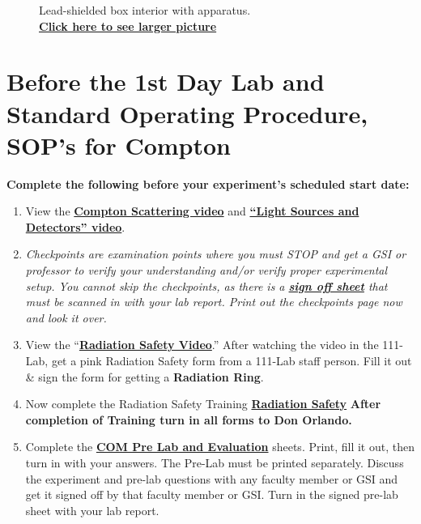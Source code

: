 \documentclass{../lab}
\begin{document}
\begin{figure}[!h]
\begin{minipage}{.49\linewidth}
    \caption{Lead-shielded box interior with apparatus. \\ \href{http://experimentationlab.berkeley.edu/sites/default/files/images/COM_Inside_3525-Lg.JPG}{\textbf{Click here to see larger picture}}}
\end{minipage} 
\end{figure}

\section{Before the 1st Day Lab and Standard Operating Procedure, SOP's for Compton}
\label{sec:BeforeTheLab}

\textbf{Complete the following before your experiment's scheduled start date:}

\begin{enumerate}
    \item View the \href{http://youtu.be/PVgqyf3kNRs}{\textbf{Compton Scattering video}} and \href{http://youtu.be/lQKLakISoBA}{\textbf{``Light Sources and Detectors'' video}}.

    \item \emph{Checkpoints are examination points where you must STOP and get a GSI or professor to verify your understanding and/or verify proper experimental setup. You cannot skip the checkpoints, as there is a \href{http://experimentationlab.berkeley.edu/node/132}{\textbf{sign off sheet}} that must be scanned in with your lab report. Print out the checkpoints page now and look it over.}

    \item View the     ``\href{http://youtu.be/KHxtzF5pZZM}{\textbf{Radiation Safety Video}}.'' After watching the video in the 111-Lab, get a pink Radiation Safety form from a 111-Lab staff person. Fill it out \& sign the form for getting a \textbf{Radiation Ring}.

    \item Now complete the Radiation Safety Training \href{http://experimentationlab.berkeley.edu/RadiationSafety}{\textbf{Radiation Safety}} \textbf{After completion of Training turn in all forms to Don Orlando.}

    \item Complete the \href{http://experimentationlab.berkeley.edu/COMPreLab}{\textbf{COM Pre Lab and Evaluation}} sheets. Print, fill it out, then turn in with your answers. The Pre-Lab must be printed separately. Discuss the experiment and pre-lab questions with any faculty member or GSI and get it signed off by that faculty member or GSI. Turn in the signed pre-lab sheet with your lab report.


\end{enumerate}
\end{document}
